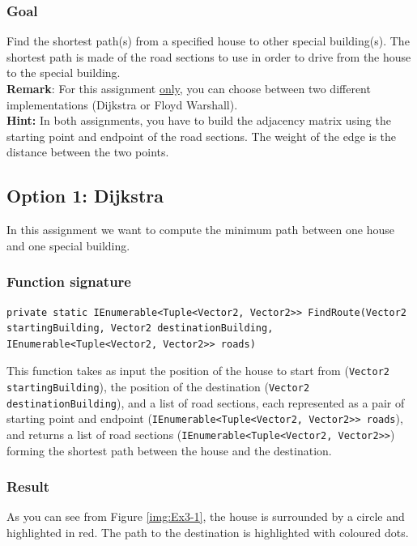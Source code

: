 \subsubsection*{Goal}
Find the shortest path(s) from a specified house to other special building(s). The shortest path is made of the road sections to use in order to drive from the house to the special building.\\
\textbf{Remark}: For this assignment \underline{only}, you can choose between two different implementations (Dijkstra or Floyd Warshall).\\
\textbf{Hint:} In both assignments, you have to build the adjacency matrix using the starting point and endpoint of the road sections. The weight of the edge is the distance between the two points.

\subsection*{Option 1: Dijkstra}
In this assignment we want to compute the minimum path between one house and one special building. 

\subsubsection*{Function signature} 
\begin{lstlisting}
private static IEnumerable<Tuple<Vector2, Vector2>> FindRoute(Vector2 startingBuilding, Vector2 destinationBuilding, IEnumerable<Tuple<Vector2, Vector2>> roads)
\end{lstlisting}

\noindent
This function takes as input the position of the house to start from (\texttt{Vector2 startingBuilding}), the position of the destination (\texttt{Vector2 destinationBuilding}), and a list of road sections, each represented as a pair of starting point and endpoint (\texttt{IEnumerable<Tuple<Vector2, Vector2>> roads}), and returns a list of road sections (\texttt{IEnumerable<Tuple<Vector2, Vector2>>}) forming the shortest path between the house and the destination.\\

\subsubsection*{Result} 
As you can see from Figure \ref{img:Ex3-1}, the house is surrounded by a circle and highlighted in red. The path to the destination is highlighted with coloured dots.

